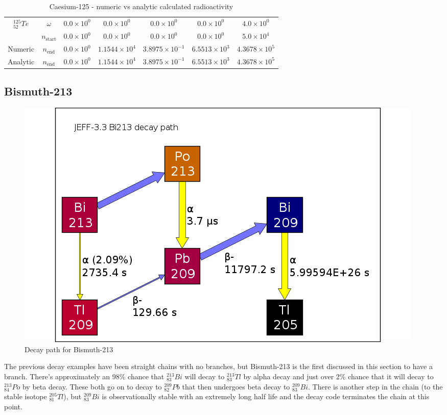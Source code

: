 \begin{table}[h]
\begin{center}
\begin{longtable}{c c c c c c c}
\hline
${}^{125}_{52}Te$ & $\omega$ & 
${0.0} \times 10^{0}$ & ${0.0} \times 10^{0}$ & ${0.0} \times 10^{0}$ &
${0.0} \times 10^{0}$ & ${4.0} \times 10^{0}$ \\
 & $n_{\text{start}}$ & 
${0.0} \times 10^{0}$ & ${0.0} \times 10^{0}$ & ${0.0} \times 10^{0}$ &
${0.0} \times 10^{0}$ & ${5.0} \times 10^{4}$ \\
Numeric & $n_{\text{end}}$ & 
${0.0} \times 10^{0}$ & ${1.1544} \times 10^{4}$ & ${3.8975} \times 10^{-1}$ & 
${6.5513} \times 10^{3}$ & ${4.3678} \times 10^{5}$ \\
Analytic & $n_{\text{end}}$ & 
${0.0} \times 10^{0}$ & ${1.1544} \times 10^{4}$ & ${3.8975} \times 10^{-1}$ & 
${6.5513} \times 10^{3}$ & ${4.3678} \times 10^{5}$ \\
\hline\hline
\end{longtable}
\end{center}
\caption{Caesium-125 - numeric vs analytic calculated radioactivity}
\label{table:cs125trialdata}
\end{table}


\clearpage
\subsection{Bismuth-213}
\FloatBarrier

\begin{figure}[!h]
\centering
		\includegraphics[width=.4\linewidth]{appendix/activity_equation/decay_paths/83bi213_decay.png}
		\caption{Decay path for Bismuth-213 \cite{jeff311}}
		\label{fig:decaybi213}
\end{figure}
\FloatBarrier

The previous decay examples have been straight chains with no branches, but Bismuth-213 is the first discussed in this section to have a branch.  There's approximately an 98\% chance that ${}^{213}_{83}Bi$ will decay to ${}^{213}_{83}Tl$ by alpha decay and just over 2\% chance that it will decay to ${}^{213}_{84}Po$ by beta decay.  These both go on to decay to ${}^{209}_{82}Pb$ that then undergoes beta decay to ${}^{209}_{83}Bi$.  There is another step in the chain (to the stable isotope ${}^{205}_{81}Tl$), but ${}^{209}_{83}Bi$ is observationally stable with an extremely long half life and the decay code terminates the chain at this point.

